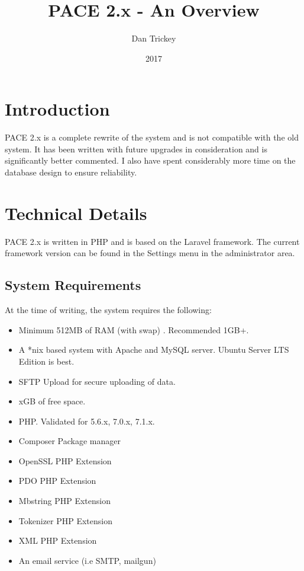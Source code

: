 \documentclass{article}
\title{PACE 2.x - An Overview}
\date{2017}
\author{Dan Trickey}
\begin{document}
	
\maketitle
{}
\newpage

\tableofcontents
\newpage


\section{Introduction}
PACE 2.x is a complete rewrite of the system and is not compatible with the old system. It has been written with future upgrades in consideration and is significantly better commented. I also have spent considerably more time on the database design to ensure reliability.

\section{Technical Details}

PACE 2.x is written in PHP and is based on the Laravel framework. The current framework version can be found in the Settings menu in the administrator area. 

\subsection{System Requirements}

At the time of writing, the system requires the following:

\begin{itemize}
	
	\item Minimum 512MB of RAM (with swap) . Recommended 1GB+. 
	\item A *nix based system with Apache and MySQL server. Ubuntu Server LTS Edition is best.
	\item SFTP Upload for secure uploading of data.
	\item xGB of free space.
	\item PHP. Validated for 5.6.x, 7.0.x, 7.1.x.
	\item Composer Package manager
	\item OpenSSL PHP Extension
	\item PDO PHP Extension
	\item Mbstring PHP Extension
	\item Tokenizer PHP Extension
	\item XML PHP Extension
	\item An email service (i.e SMTP, mailgun)

\end{itemize}
\end{document}
